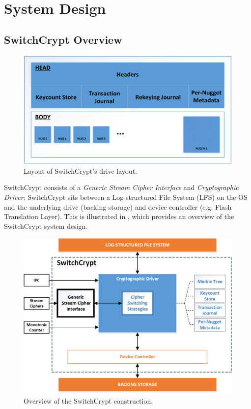 \section{System Design} \label{sec:sc-design}

\subsection{SwitchCrypt Overview} \label{subsec:overview}

\begin{figure}[t]
   \centering
   \includegraphics[width=\linewidth]{figs/sc/backstore.png}
   \caption{Layout of SwitchCrypt's drive layout.} \label{fig:sc-backstore}
\end{figure}

SwitchCrypt consists of a \emph{Generic Stream Cipher Interface} and
\emph{Cryptographic Driver}; SwitchCrypt sits between a Log-structured File
System (LFS) on the OS and the underlying drive (backing storage) and device
controller (e.g. Flash Translation Layer). This is illustrated in
, which provides an overview of the SwitchCrypt system
design.

\begin{figure}[ht]
   \centering
   \includegraphics[width=\linewidth]{figs/sc/overview.png}
   \caption{Overview of the SwitchCrypt construction.} \label{fig:sc-overview}
\end{figure}

